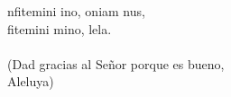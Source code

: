 \begin{cancion}[Confitemini][Taizé]%
	nfitemini ino, oniam nus,\\
	fitemini mino, lela.\\
	\jump\\
(Dad gracias al Señor porque es bueno,\\
 Aleluya)\\
\end{cancion}%
